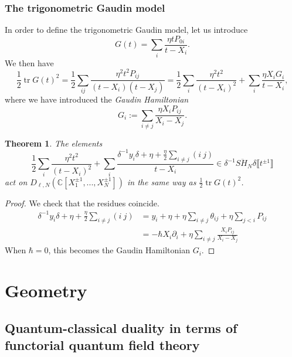 \documentclass[11pt]{report}
\newtheorem{theorem}{Theorem}[section]
\theoremstyle{definition}
\theoremstyle{remark}
\theoremstyle{remark}
\newcommand{\C}{\mathbb{C}}
\begin{document}
\subsection{The trigonometric Gaudin model}

In order to define the trigonometric Gaudin model, let us introduce
\begin{equation*}
G(t) = \sum_i \frac{\eta tP_{0i}}{t-X_i}.
\end{equation*}
We then have
\begin{equation*}
\frac{1}{2} \operatorname{tr} G(t)^2 = \frac{1}{2} \sum_{ij} \frac{\eta^2 t^2 P_{ij}}{(t-X_i)(t-X_j)} = \frac{1}{2} \sum_i \frac{\eta^2 t^2}{(t-X_i)^2} + \sum_i \frac{\eta X_i G_i}{t-X_i},
\end{equation*}
where we have introduced the \emph{Gaudin Hamiltonian}
\begin{equation*}
G_i := \sum_{i \neq j} \frac{\eta X_i P_{ij}}{X_i-X_j}.
\end{equation*}

\begin{theorem}
The elements
\begin{equation*}
\frac{1}{2} \sum_i \frac{\eta^2 t^2}{(t-X_i)^2} + \sum_i \frac{\delta^{-1} y_i \delta + \eta + \frac{\eta}{2} \sum_{i \neq j} (i \ j)}{t-X_i} \in \delta^{-1} S\ddot H_N \delta\llbracket t^{\pm 1} \rrbracket
\end{equation*}
act on $D_{\ell,N}(\C[X_1^{\pm 1},...,X_N^{\pm 1}])$ in the same way as $\frac{1}{2} \operatorname{tr} G(t)^2$.
\end{theorem}

\begin{proof}
We check that the residues coincide.
\begin{align*}
\delta^{-1} y_i \delta + \eta + \frac{\eta}{2} \sum_{i \neq j} (i \ j)
&= y_i + \eta + \eta \sum_{i \neq j} \theta_{ij} + \eta \sum_{j<i} P_{ij} \\
&= -\hbar X_i \partial_i + \eta \sum_{i \neq j} \frac{X_i P_{ij}}{X_i-X_j}
\end{align*}
When $\hbar = 0$, this becomes the Gaudin Hamiltonian $G_i$.
\end{proof}

\chapter{Geometry}\label{chapter:geometry}

\section{Quantum-classical duality in terms of functorial quantum field theory}
\end{document}
